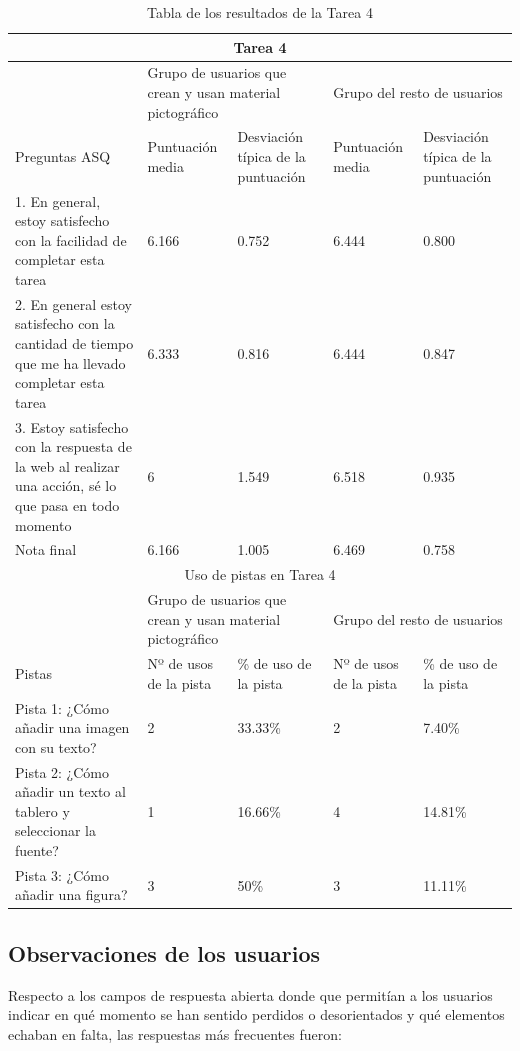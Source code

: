 \begin{table}

\begin{tabular}{ |p{4cm}|p{2cm}|p{2cm}|p{2cm}|p{2cm}|  }
	\hline
	\multicolumn{5}{|c|}{Tarea 4} \\
	\hline
	& \multicolumn{2}{|p{4cm}|}{Grupo de usuarios que crean y usan material pictográfico} & \multicolumn{2}{|p{4cm}|}{Grupo del resto de usuarios }  \\ 
	\hline
	Preguntas ASQ & Puntuación media  &Desviación típica de la puntuación & Puntuación media & Desviación típica de la puntuación\\
	\hline
	1. En general, estoy satisfecho con la facilidad de completar esta tarea &6.166  &0.752 &6.444  &0.800\\
	\hline
	2. En general estoy satisfecho con la cantidad de tiempo que me ha llevado completar esta tarea &6.333  &0.816  &6.444 &0.847\\
	\hline
	3. Estoy satisfecho con la respuesta de la web al realizar una acción, sé lo que pasa en todo momento &6 &1.549 &6.518   &0.935\\
	\hline
	Nota final &6.166 &1.005 &6.469  &0.758\\
	\hline
	\multicolumn{5}{|c|}{Uso de pistas en Tarea 4} \\
	\hline
	& \multicolumn{2}{|p{4cm}|}{Grupo de usuarios que crean y usan material pictográfico} & \multicolumn{2}{|p{4cm}|}{Grupo del resto de usuarios }  \\ 
	\hline
	Pistas &Nº de usos de la pista &\% de uso de la pista&Nº de usos de la pista&\% de uso de la pista\\
	\hline
	Pista 1: ¿Cómo añadir una imagen con su texto? &2  &33.33\% &2 &7.40\%\\
	\hline
	Pista 2: ¿Cómo añadir un texto al tablero y seleccionar la fuente? &1 &16.66\%  &4 &14.81\%\\
	\hline
	Pista 3: ¿Cómo añadir una figura? &3 &50\% &3   &11.11\% \\
	\hline
\end{tabular}
\caption{\label{tab:area4respuestas}Tabla de los resultados de la Tarea 4}
\end{table}

\subsection{Observaciones de los usuarios}
Respecto a los campos de respuesta abierta donde que permitían a los usuarios indicar en qué momento se han sentido perdidos o desorientados  y qué elementos echaban en falta, las respuestas más frecuentes fueron: 


